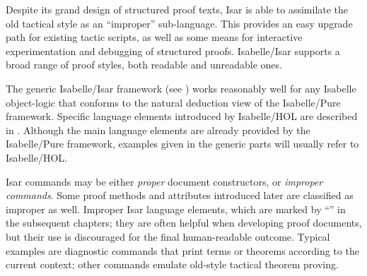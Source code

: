 \begin{isabellebody}
\begin{isamarkuptext}
  Despite its grand design of structured proof texts, Isar is able to
  assimilate the old tactical style as an ``improper'' sub-language.
  This provides an easy upgrade path for existing tactic scripts, as
  well as some means for interactive experimentation and debugging of
  structured proofs.  Isabelle/Isar supports a broad range of proof
  styles, both readable and unreadable ones.

  \medskip The generic Isabelle/Isar framework (see
  ) works reasonably well for any Isabelle
  object-logic that conforms to the natural deduction view of the
  Isabelle/Pure framework.  Specific language elements introduced by
  Isabelle/HOL are described in .  Although the main
  language elements are already provided by the Isabelle/Pure
  framework, examples given in the generic parts will usually refer to
  Isabelle/HOL.

  \medskip Isar commands may be either \emph{proper} document
  constructors, or \emph{improper commands}.  Some proof methods and
  attributes introduced later are classified as improper as well.
  Improper Isar language elements, which are marked by ``'' in the subsequent chapters; they are often helpful
  when developing proof documents, but their use is discouraged for
  the final human-readable outcome.  Typical examples are diagnostic
  commands that print terms or theorems according to the current
  context; other commands emulate old-style tactical theorem proving.%
\end{isamarkuptext}%
\isamarkuptrue%
%
\isadelimtheory
%
\endisadelimtheory
%
\isatagtheory
{}\isamarkupfalse%
%
\endisatagtheory
{\isafoldtheory}%
%
\isadelimtheory
%
\endisadelimtheory
\isanewline
\end{isabellebody}%
